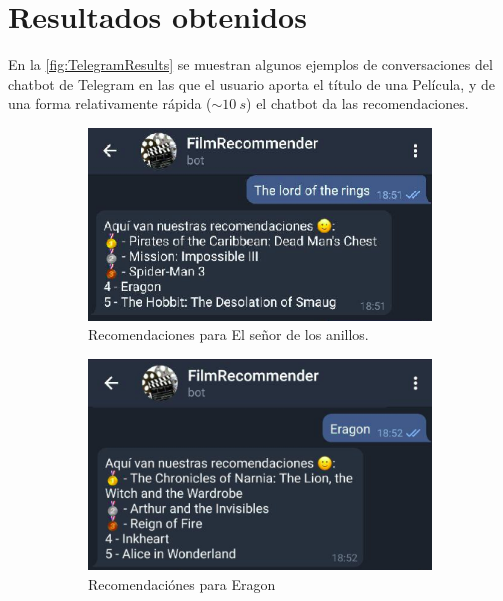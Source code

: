 \section{Resultados obtenidos}

En la \autoref{fig:TelegramResults} se muestran algunos ejemplos de conversaciones del chatbot de Telegram en las que el usuario aporta el título de una Película, y de una forma relativamente rápida ($\sim 10\ s$) el chatbot da las recomendaciones.\\


\begin{figure}[H]
\begin{subfigure}{.5\textwidth}
  \centering
  \includegraphics[width=.9\linewidth]{contenido/imagenes/sc1.png}
  \caption{Recomendaciones para El señor de los anillos.}
  \label{fig:sc1}
\end{subfigure}%
\begin{subfigure}{.5\textwidth}
  \centering
  \includegraphics[width=.9\linewidth]{contenido/imagenes/sc2.png}
  \caption{Recomendaciónes para Eragon}
  \label{fig:sc2}
\end{subfigure}
\\
\begin{subfigure}{.5\textwidth}

\end{subfigure}
\end{figure}
